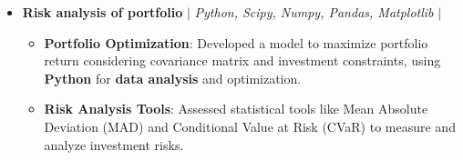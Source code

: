 \documentclass[10pt]{extarticle}
\begin{document}
\begin{itemize}
      \item \textbf{Risk analysis of portfolio} $|$ \textit{Python, Scipy, Numpy, Pandas, Matplotlib} $|$ \textit{\href{https://github.com/ankitT20/Risk_analysis_Portfolio} {\color{blue}{GitHub}}}
    \begin{itemize}
         \item \textbf{Portfolio Optimization}: Developed a model to maximize portfolio return considering covariance matrix and investment constraints, using \textbf{Python} for \textbf{data analysis} and optimization.
        \item \textbf{Risk Analysis Tools}: Assessed statistical tools like Mean Absolute Deviation (MAD) and Conditional Value at Risk (CVaR) to measure and analyze investment risks.
  \end{itemize}
    
    
\end{itemize}
\end{document}
